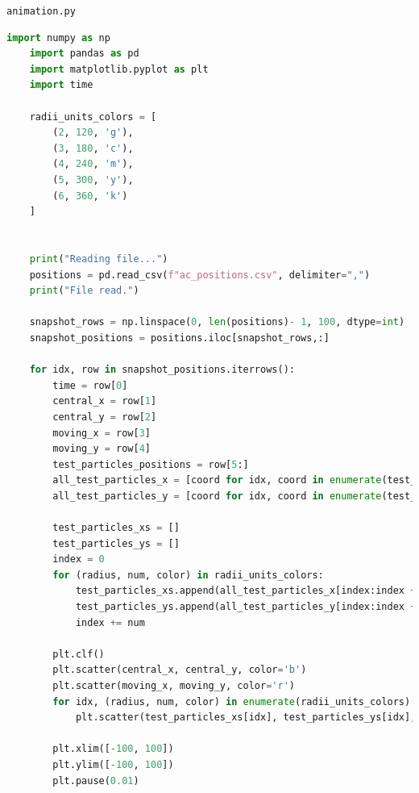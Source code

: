 \documentclass[twoside,twocolumn]{article}
\begin{document}
\newpage
{\large \texttt{animation.py}}
\begin{lstlisting}[language=Python, breaklines=true]
    import numpy as np
    import pandas as pd
    import matplotlib.pyplot as plt
    import time

    radii_units_colors = [
        (2, 120, 'g'),
        (3, 180, 'c'),
        (4, 240, 'm'), 
        (5, 300, 'y'),
        (6, 360, 'k')
    ]


    print("Reading file...")
    positions = pd.read_csv(f"ac_positions.csv", delimiter=",")
    print("File read.")

    snapshot_rows = np.linspace(0, len(positions)- 1, 100, dtype=int)
    snapshot_positions = positions.iloc[snapshot_rows,:]

    for idx, row in snapshot_positions.iterrows():
        time = row[0]
        central_x = row[1]
        central_y = row[2]
        moving_x = row[3]
        moving_y = row[4]
        test_particles_positions = row[5:]
        all_test_particles_x = [coord for idx, coord in enumerate(test_particles_positions) if idx % 2 == 0]
        all_test_particles_y = [coord for idx, coord in enumerate(test_particles_positions) if idx % 2 == 1]

        test_particles_xs = []
        test_particles_ys = []
        index = 0
        for (radius, num, color) in radii_units_colors:
            test_particles_xs.append(all_test_particles_x[index:index + num])
            test_particles_ys.append(all_test_particles_y[index:index + num])
            index += num

        plt.clf()
        plt.scatter(central_x, central_y, color='b')
        plt.scatter(moving_x, moving_y, color='r')
        for idx, (radius, num, color) in enumerate(radii_units_colors):
            plt.scatter(test_particles_xs[idx], test_particles_ys[idx], s=1, color=color, label=rf"$r = {radius}$")
            
        plt.xlim([-100, 100])
        plt.ylim([-100, 100])
        plt.pause(0.01)

\end{lstlisting}
\vfill




{}

\end{document}
